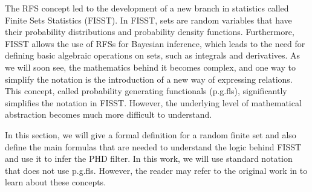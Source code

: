 The RFS concept led to the development of a new branch in statistics called Finite Sets Statistics (FISST). In FISST, sets are random variables that have their probability distributions and probability density functions. Furthermore, FISST allows the use of RFSs for Bayesian inference, which leads to the need for defining basic algebraic operations on sets, such as integrals and derivatives. As we will soon see, the mathematics behind it becomes complex, and one way to simplify the notation is the introduction of a new way of expressing relations. This concept, called probability generating functionals (p.g.fls), significantly simplifies the notation in FISST. However, the underlying level of mathematical abstraction becomes much more difficult to understand.

In this section, we will give a formal definition for a random finite set and also define the main formulas that are needed to understand the logic behind FISST and use it to infer the PHD filter. In this work, we will use standard notation that does not use p.g.fls. However, the reader may refer to the original work in \cite{mahlerMultitargetBayesFiltering2003} to learn about these concepts.
